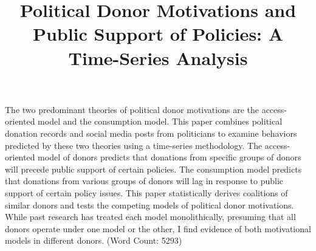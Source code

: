 \documentclass[12pt,]{article}
\title{Political Donor Motivations and Public Support of Policies: A
Time-Series Analysis  }
\author{}
\date{}
\renewenvironment{abstract}
 {{%
    \setlength{\leftmargin}{0mm}
    \setlength{\rightmargin}{\leftmargin}%
  }%
  \relax}
 {\endlist}
\begin{document}
%    


{%
\setlength{\parindent}{0pt}
\thispagestyle{plain}
{\fontsize{18}{20}\selectfont\raggedright 
\maketitle  %

}

{
   \vskip 13.5pt\relax \normalsize\fontsize{11}{12} 
 

}

}








\begin{abstract}

    \hbox{\vrule height .2pt width 39.14pc}

    \vskip 8.5pt %

\noindent The two predominant theories of political donor motivations
are the access-oriented model and the consumption model. This paper
combines political donation records and social media posts from
politicians to examine behaviors predicted by these two theories using a
time-series methodology. The access-oriented model of donors predicts
that donations from specific groups of donors will precede public
support of certain policies. The consumption model predicts that
donations from various groups of donors will lag in response to public
support of certain policy issues. This paper statistically derives
coalitions of similar donors and tests the competing models of political
donor motivations. While past research has treated each model
monolithically, presuming that all donors operate under one model or the
other, I find evidence of both motivational models in different donors.
(Word Count: 5293)


    \hbox{\vrule height .2pt width 39.14pc}


\end{abstract}


\vskip -8.5pt



\noindent \doublespacing 
\end{document}
